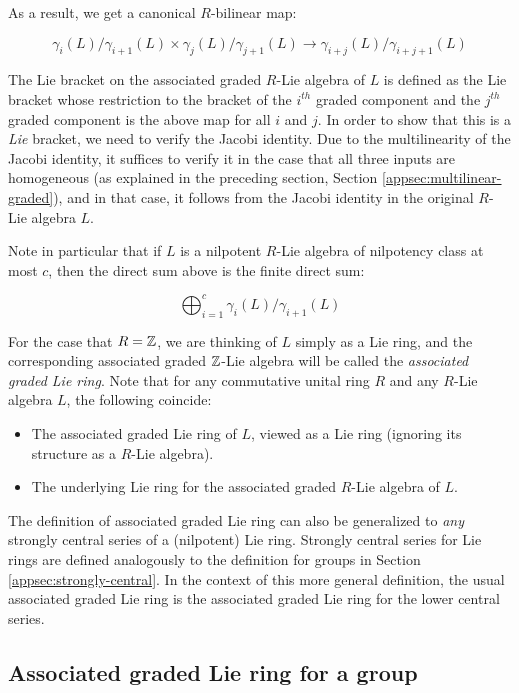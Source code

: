 As a result, we get a canonical $R$-bilinear map:

$$\gamma_i(L)/\gamma_{i+1}(L) \times \gamma_j(L)/\gamma_{j+1}(L) \to \gamma_{i+j}(L)/\gamma_{i+j+1}(L)$$

The Lie bracket on the associated graded $R$-Lie algebra of $L$ is
defined as the Lie bracket whose restriction to the bracket of the
$i^{th}$ graded component and the $j^{th}$ graded component is the
above map for all $i$ and $j$. In order to show that this is a {\em
  Lie} bracket, we need to verify the Jacobi identity. Due to the
multilinearity of the Jacobi identity, it suffices to verify it in the
case that all three inputs are homogeneous (as explained in the
preceding section, Section \ref{appsec:multilinear-graded}), and in
that case, it follows from the Jacobi identity in the original $R$-Lie
algebra $L$.

Note in particular that if $L$ is a nilpotent $R$-Lie algebra of
nilpotency class at most $c$, then the direct sum above is the finite
direct sum:

$$\bigoplus_{i=1}^c \gamma_i(L)/\gamma_{i+1}(L)$$

For the case that $R = \mathbb{Z}$, we are thinking of $L$ simply as a Lie
ring, and the corresponding associated graded $\mathbb{Z}$-Lie algebra will be
called the {\em associated graded Lie ring}. Note that for any
commutative unital ring $R$ and any $R$-Lie algebra $L$, the following
coincide:

\begin{itemize}
\item The associated graded Lie ring of $L$, viewed as a Lie ring
  (ignoring its structure as a $R$-Lie algebra).
\item The underlying Lie ring for the associated graded $R$-Lie
  algebra of $L$.
\end{itemize}

The definition of associated graded Lie ring can also be generalized
to {\em any} strongly central series of a (nilpotent) Lie
ring. Strongly central series for Lie rings are defined analogously to
the definition for groups in Section \ref{appsec:strongly-central}. In
the context of this more general definition, the usual associated
graded Lie ring is the associated graded Lie ring for the lower
central series.
 
\subsection{Associated graded Lie ring for a group}\label{appsec:associated-graded-group}

